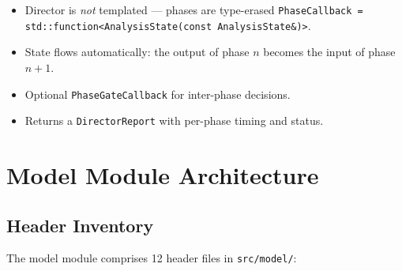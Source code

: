 \begin{itemize}[nosep]
  \item Director is \emph{not} templated --- phases are type-erased
        \texttt{PhaseCallback = std::function<AnalysisState(const AnalysisState\&)>}.
  \item State flows automatically: the output of phase $n$ becomes the input
        of phase $n{+}1$.
  \item Optional \texttt{PhaseGateCallback} for inter-phase decisions.
  \item Returns a \texttt{DirectorReport} with per-phase timing and status.
\end{itemize}


\section{Model Module Architecture}
\label{sec:arch:model}


\subsection{Header Inventory}
\label{sec:arch:model:inventory}

The model module comprises 12 header files in \texttt{src/model/}:

